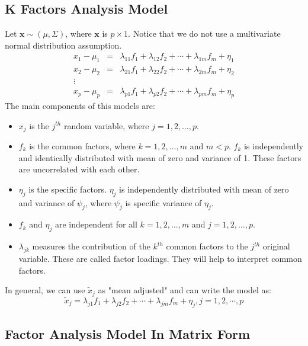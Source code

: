 \documentclass{article}
\begin{document}
\subsection{K Factors Analysis Model}
Let $\mathbf{x}\sim(\mu,\Sigma)$, where $\mathbf{x}$ is $p\times 1$. Notice that we do not use a multivariate normal distribution assumption. 
\begin{eqnarray*}
x_1-\mu_1 &=& \lambda_{11}f_1+\lambda_{12}f_2+\cdots+\lambda_{1m}f_m+\eta_1\\
x_2-\mu_2 &=& \lambda_{21}f_1+\lambda_{22}f_2+\cdots+\lambda_{2m}f_m+\eta_2\\
\vdots \\
x_p-\mu_p &=& \lambda_{p1}f_1+\lambda_{p2}f_2+\cdots+\lambda_{pm}f_m+\eta_p
\end{eqnarray*}
The main components of this models are:
\begin{itemize}
    \item $x_j$ is the $j^{th}$ random variable, where $j=1,2,\hdots,p$.
    \item $f_k$ is the common factors, where $k=1,2,\hdots,m$ and $m<p$. $f_k$ is independently and identically distributed with mean of zero and variance of 1. These factors are uncorrelated with each other.  
    \item $\eta_j$ is the specific factors. $\eta_j$ is independently distributed with mean of zero and variance of $\psi_j$, where $\psi_j$ is specific variance of $\eta_j$.
    \item $f_k$ and $\eta_j$ are independent for all $k=1,2,\hdots,m$ and $j=1,2,\hdots,p$.
    \item $\lambda_{jk}$ measures the contribution of the $k^{th}$ common factors to the $j^{th}$ original variable. These are called factor loadings. They will help to interpret common factors.
\end{itemize}
In general, we can use $\tilde{x}_j$ as "mean adjusted" and can write the model as:
\[\tilde{x}_j=\lambda_{j1}f_1+\lambda_{j2}f_2+\cdots+\lambda_{jm}f_m+\eta_j, j=1,2,\cdots,p\]

\subsection{Factor Analysis Model In Matrix Form}
\end{document}
